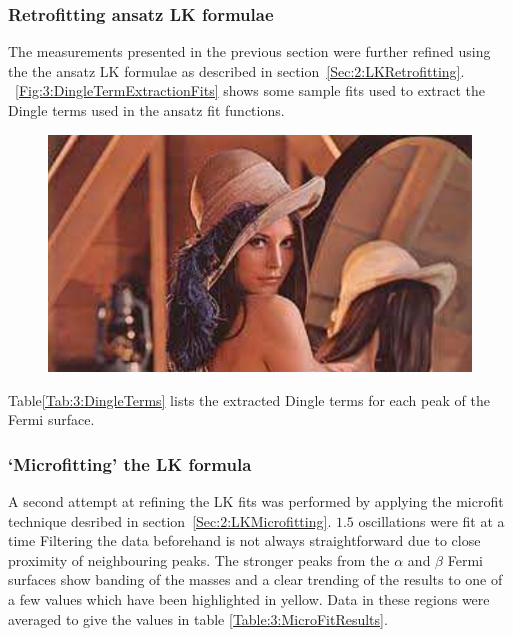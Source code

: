 \subsubsection{Retrofitting ansatz LK formulae}

The measurements presented in the previous section were further refined using the the ansatz LK formulae as described in section~\ref{Sec:2:LKRetrofitting}. \Fig~\ref{Fig:3:DingleTermExtractionFits} shows some sample fits used to extract the Dingle terms used in the ansatz fit functions.
\begin{figure}[h!]
    \begin{center}
        \includegraphics[scale=0.7]{Misc/TODO}
        \caption{}
        \label{Fig:3:RetrofittedLKFits}
    \end{center}
\end{figure}
Table\ref{Tab:3:DingleTerms} lists the extracted Dingle terms for each peak of the Fermi surface.

\subsubsection{`Microfitting' the LK formula}

A second attempt at refining the LK fits was performed by applying the microfit technique desribed in section~\ref{Sec:2:LKMicrofitting}. $1.5$ oscillations were fit at a time Filtering the data beforehand is not always straightforward due to close proximity of neighbouring peaks. The stronger peaks from the $\alpha$ and $\beta$ Fermi surfaces show banding of the masses and a clear trending of the results to one of a few values which have been highlighted in yellow. Data in these regions were averaged to give the values in table \ref{Table:3:MicroFitResults}.


